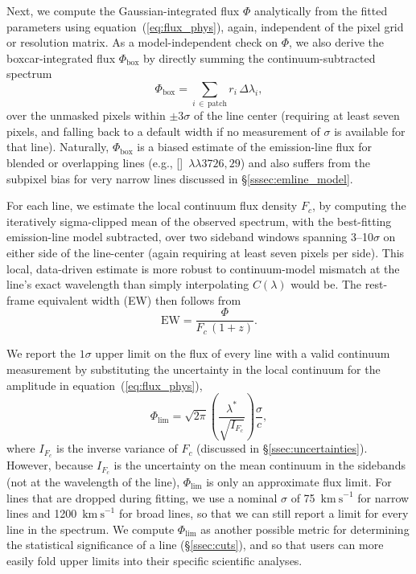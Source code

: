 \documentclass[modern,linenumbers]{aastex702}
\newcommand{\kms}{\ensuremath{\mathrm{km~s}^{-1}}}
\newcommand{\oiidoublet}{[\ion{O}{2}]~$\lambda\lambda3726,29$}
\begin{document}
Next, we compute the Gaussian-integrated flux $\Phi$ analytically from
the fitted parameters using equation~(\ref{eq:flux_phys}), again,
independent of the pixel grid or resolution matrix. As a
model-independent check on $\Phi$, we also derive the
boxcar-integrated flux $\Phi_\mathrm{box}$ by directly summing the
continuum-subtracted spectrum
\begin{equation}
  \Phi_\mathrm{box} = \sum_{i\,\in\,\mathrm{patch}} r_i\,\Delta\lambda_i,
  \label{eq:boxflux}
\end{equation}
over the unmasked pixels within $\pm3\sigma$ of the line center
(requiring at least seven pixels, and falling back to a default width
if no measurement of $\sigma$ is available for that line). Naturally,
$\Phi_\mathrm{box}$ is a biased estimate of the emission-line flux for
blended or overlapping lines (e.g., \oiidoublet) and also suffers
from the subpixel bias for very narrow lines discussed in
\S\ref{sssec:emline_model}.

For each line, we estimate the local continuum flux density $F_c$, by
computing the iteratively sigma-clipped mean of the observed spectrum,
with the best-fitting emission-line model subtracted, over two
sideband windows spanning 3--10$\sigma$ on either side of the
line-center (again requiring at least seven pixels per side). This
local, data-driven estimate is more robust to continuum-model mismatch
at the line's exact wavelength than simply interpolating $C(\lambda)$
would be. The rest-frame equivalent width (EW) then follows from
\begin{equation}
  \mathrm{EW} = \frac{\Phi}{F_c\,(1+z)}.
  \label{eq:ew}
\end{equation}

We report the $1\sigma$ upper limit on the flux of every line with a
valid continuum measurement by substituting the uncertainty in the
local continuum for the amplitude in equation~(\ref{eq:flux_phys}),
\begin{equation}
  \Phi_\mathrm{lim} = \sqrt{2\pi} \left(
  \frac{\lambda^*}{\sqrt{I_{F_c}}} \right) \frac{\sigma}{c},
  \label{eq:fluxlimit}
\end{equation}
where $I_{F_c}$ is the inverse variance of $F_c$ (discussed in
\S\ref{ssec:uncertainties}). However, because $I_{F_c}$ is the
  uncertainty on the mean continuum in the sidebands (not at the
  wavelength of the line), $\Phi_\mathrm{lim}$ is only an approximate
  flux limit. For lines that are dropped during fitting, we use a
nominal $\sigma$ of 75~\kms{} for narrow lines and 1200~\kms{} for
broad lines, so that we can still report a limit for every line in the
spectrum. We compute $\Phi_\mathrm{lim}$ as another possible metric
for determining the statistical significance of a line
(\S\ref{ssec:cuts}), and so that users can more easily fold
upper limits into their specific scientific analyses.
\end{document}
